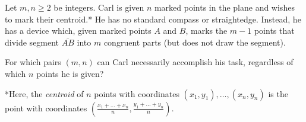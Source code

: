 Let $m, n \ge 2$ be integers. Carl is given $n$ marked points in the plane and wishes to mark their centroid.* He has no standard compass or straightedge. Instead, he has a device which, given marked points $A$ and $B$, marks the $m-1$ points that divide segment $\overline{AB}$ into $m$ congruent parts (but does not draw the segment).

For which pairs $(m,n)$ can Carl necessarily accomplish his task, regardless of which $n$ points he is given?

*Here, the \textit{centroid} of $n$ points with coordinates $(x_1, y_1), \dots, (x_n, y_n)$ is the point with coordinates $\left( \frac{x_1 + \dots + x_n}{n}, \frac{y_1 + \dots + y_n}{n}\right)$.


